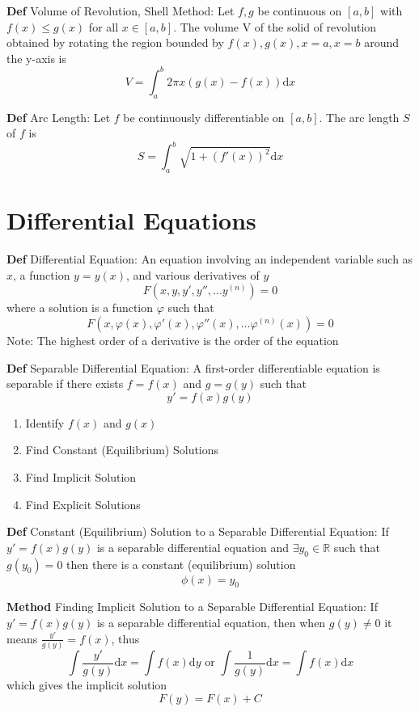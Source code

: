 \documentclass[11pt,notitlepage]{report}
\begin{document}
\textbf{Def} Volume of Revolution, Shell Method: Let $f, g$ be continuous on $[a, b]$ with $f(x) \leq g(x)$ for all $x \in [a, b]$. The volume V of the solid of revolution obtained by rotating the region bounded by $f(x), g(x), x=a, x=b$ around the y-axis is
$$V = \int_a^b 2\pi x(g(x)-f(x))\mathrm{d}x$$

\textbf{Def} Arc Length: Let $f$ be continuously differentiable on $[a, b]$. The arc length $S$ of $f$ is
$$S = \int_a^b \sqrt{1+(f'(x))^2}\mathrm{d}x$$

\chapter{Differential Equations}

\textbf{Def} Differential Equation: An equation involving an independent variable such as $x$, a function $y=y(x)$, and various derivatives of $y$
$$F(x, y, y', y'', \dots y^{(n)}) = 0$$
where a solution is a function $\varphi$ such that
$$F(x, \varphi(x), \varphi'(x), \varphi''(x), \dots \varphi^{(n)}(x)) = 0$$
\hspace*{5mm} Note: The highest order of a derivative is the order of the equation

\textbf{Def} Separable Differential Equation: A first-order differentiable equation is separable if there exists $f = f(x)$ and $g = g(y)$ such that
$$y' = f(x)g(y)$$
\begin{enumerate}
    \item Identify $f(x)$ and $g(x)$
    \item Find Constant (Equilibrium) Solutions
    \item Find Implicit Solution
    \item Find Explicit Solutions
\end{enumerate}

\textbf{Def} Constant (Equilibrium) Solution to a Separable Differential Equation: If $y' = f(x)g(y)$ is a separable differential equation and $\exists y_0 \in \mathbb R$ such that $g(y_0) = 0$ then there is a constant (equilibrium) solution
$$\phi(x) = y_0$$

\textbf{Method} Finding Implicit Solution to a Separable Differential Equation: If $y' = f(x)g(y)$ is a separable differential equation, then when $g(y) \ne 0$ it means $\frac{y'}{g(y)}=f(x)$, thus
$$\int \frac{y'}{g(y)} \mathrm{d}x = \int f(x) \mathrm{d}y \text{ or } \int \frac{1}{g(y)} \mathrm{d}x = \int f(x) \mathrm{d}x$$ which gives the implicit solution $$F(y) = F(x) + C$$
\end{document}
